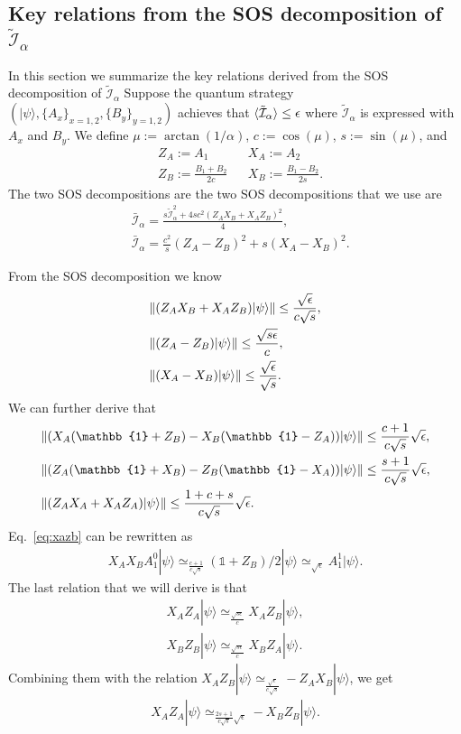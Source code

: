 \documentclass[11pt,letterpaper]{article}
\newcommand{\ket}[1]{|#1\rangle}
\DeclarePairedDelimiter{\norm}{\lVert}{\rVert}
\DeclarePairedDelimiter{\ip}{\langle}{\rangle}
\newcommand{\1}{\mathbb{1}}
\newcommand{\I}{\mathcal{I}}
\newcommand{\appd}[1]{\simeq_{#1}}
\theoremstyle{definition}
\begin{document}
\subsection{Key relations from the SOS decomposition of $\tilde{\I}_\alpha$}
In this section we summarize the key relations derived from the SOS decomposition of $\tilde{\I}_\alpha$
Suppose the quantum strategy $(\ket{\psi}, \{A_x\}_{x=1,2}, \{B_{y }\}_{y=1,2})$ achieves that 
$\ip{\tilde{\I}_\alpha} \leq \epsilon$ where
$\tilde{\I}_\alpha$ is expressed with $A_x$ and $B_y$.
We define $\mu := \arctan(1/\alpha)$, $c := \cos(\mu)$, $s := \sin(\mu)$, and
\begin{align}
	&Z_A := A_1 && X_A := A_2\\
	&Z_B := \frac{B_1+B_2}{2c} && X_B := \frac{B_1-B_2}{2s}.
\end{align}
The two SOS decompositions are 
the two SOS decompositions that we use are
\begin{align}
	\label{eq:sos1}&\bar{\I}_\alpha = \frac{s \tilde{\I}_\alpha^2 + 4sc^2(Z_AX_B+X_AZ_B)^2}{4},\\
	\label{eq:sos2}&\bar{\I}_\alpha = \frac{c^2}{s}(Z_A-Z_B)^2 + s (X_A-X_B)^2.
\end{align}

From the SOS decomposition we know 
\begin{align}
	&\norm{(Z_AX_B+X_AZ_B)\ket{\psi}} \leq \frac{\sqrt{\epsilon}}{c\sqrt{s}},\\
	&\norm{(Z_A-Z_B)\ket{\psi}} \leq \frac{\sqrt{s\epsilon}}{c},\\
	&\norm{(X_A-X_B)\ket{\psi}} \leq \frac{\sqrt{\epsilon}}{\sqrt{s}}.
\end{align}
We can further derive that 
\begin{align}
	\label{eq:xazb}&\norm{(X_A(\1+Z_B)-X_B(\1-Z_A))\ket{\psi}} \leq \frac{c+1}{c\sqrt{s}} \sqrt{\epsilon},\\
	\label{eq:zaxb}&\norm{(Z_A(\1+X_B)-Z_B(\1-X_A))\ket{\psi}}\leq \frac{s+1}{c\sqrt{s}} \sqrt{\epsilon},\\
	&\norm{(Z_AX_A+X_AZ_A)\ket{\psi}} \leq \frac{1+c+s}{c\sqrt{s}} \sqrt{\epsilon}.
\end{align}
Eq.~\ref{eq:xazb} can be rewritten as 
\begin{align}
	X_AX_BA_1^0 \ket{\psi} \appd{\frac{c+1}{c\sqrt{s}}} (\1+Z_B)/2 \ket{\psi} \appd{\sqrt{\epsilon}} A_1^1 \ket{\psi}.
\end{align}
The last relation that we will derive is that 
\begin{align}
	X_AZ_A \ket{\psi} \appd{\frac{\sqrt{s\epsilon}}{c}} X_AZ_B \ket{\psi},\\
	X_BZ_B \ket{\psi} \appd{\frac{\sqrt{s\epsilon}}{c}} X_BZ_A\ket{\psi}.
\end{align}
Combining them with the relation $X_AZ_B \ket{\psi} \appd{\frac{\sqrt{\epsilon}}{c\sqrt{s}}} -Z_AX_B\ket{\psi}$,
we get 
\begin{align}
	X_AZ_A \ket{\psi} \appd{\frac{2s+1}{c\sqrt{s}} \sqrt{\epsilon}} -X_BZ_B \ket{\psi}.
\end{align}
\end{document}
